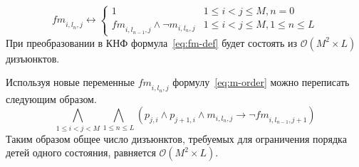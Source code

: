 \begin{equation}
\label{eq:fm-def}
  \mathit{fm}_{i,l_{n},j} \leftrightarrow 
    \begin{cases} 
      1                               & 1 \leq i < j \leq M, n = 0 \\
      \mathit{fm}_{i,l_{n - 1},j} \wedge \neg m_{i,l_{n},j}  & 1 \leq i < j \leq M, 1 \leq n \leq L
    \end{cases} 
\end{equation}
%
При преобразовании в КНФ формула~\eqref{eq:fm-def} будет состоять из $\mathcal{O}\left(M^{2} \times L\right)$ дизъюнктов.

Используя новые переменные $\mathit{fm}_{i,l_{n},j}$ формулу~\eqref{eq:m-order} можно переписать следующим образом.
%
\begin{equation}
\label{eq:m-order-tight}
  \bigwedge_{1 \leq i < j < M} \bigwedge_{1 \leq n \leq L} \left(p_{j,i} \wedge p_{j + 1, i} \wedge m_{i,l_{n}, j} \rightarrow \neg \mathit{fm}_{i, l_{n - 1}, j + 1}\right)
\end{equation}
%
Таким образом общее число дизъюнктов, требуемых для ограничения порядка детей одного состояния, равняется $\mathcal{O}\left(M^{2} \times L\right)$. 
